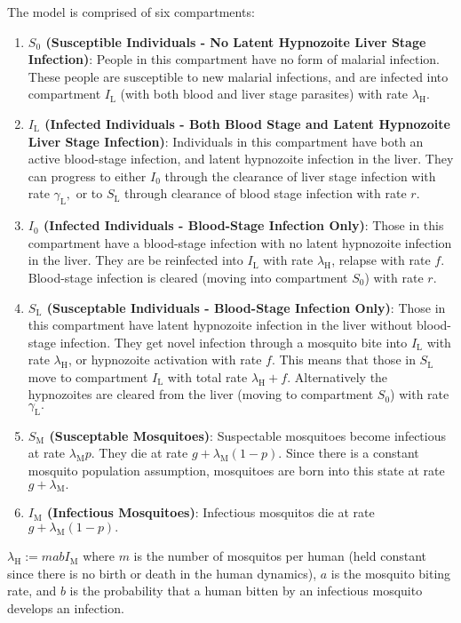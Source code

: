The model is comprised of six compartments: \begin{enumerate}
    \item \textbf{$S_0$ (Susceptible Individuals - No Latent Hypnozoite Liver Stage Infection)}: People in this compartment have no form of malarial infection. These people are susceptible to new malarial infections, and are infected into compartment $I_\mathrm{L}$ (with both blood and liver stage parasites) with rate $\lambda_\mathrm{H}$.
    \item \textbf{$I_\mathrm{L}$ (Infected Individuals - Both Blood Stage and Latent Hypnozoite Liver Stage Infection)}:  Individuals in this compartment have both an active blood-stage infection, and latent hypnozoite infection in the liver. They can progress to either $I_0$ through the clearance of liver stage infection with rate $\gamma_\mathrm{L},$ or to $S_\mathrm{L}$ through clearance of blood stage infection with rate $r$.
    \item \textbf{$I_0$ (Infected Individuals - Blood-Stage Infection Only)}: Those in this compartment have a blood-stage infection with no latent hypnozoite infection in the liver. They are be reinfected into $I_\mathrm{L}$ with rate $\lambda_\mathrm{H}$, relapse with rate $f$. Blood-stage infection is cleared (moving into compartment $S_0$) with rate $r$.
    \item \textbf{$S_\mathrm{L}$ (Susceptable Individuals - Blood-Stage Infection Only)}: Those in this compartment have latent hypnozoite infection in the liver without blood-stage infection. They get novel infection through a mosquito bite into $I_\mathrm{L}$ with rate $\lambda_\mathrm{H}$, or hypnozoite activation with rate $f$. This means that those in $S_\mathrm{L}$ move to compartment $I_\mathrm{L}$ with total rate $\lambda_\mathrm{H} + f.$ Alternatively the hypnozoites are cleared from the liver (moving to compartment $S_0$) with rate $\gamma_\mathrm{L}.$
    \item \textbf{$S_\mathrm{M}$ (Susceptable Mosquitoes)}: Suspectable mosquitoes become infectious at rate $\lambda_\mathrm{M}p.$ They die at rate $g + \lambda_\mathrm{M}(1 - p).$ Since there is a constant mosquito population assumption, mosquitoes are born into this state at rate $g + \lambda_\mathrm{M}.$
    \item \textbf{$I_\mathrm{M}$ (Infectious Mosquitoes)}: Infectious mosquitos die at rate $g + \lambda_\mathrm{M}(1 - p).$
\end{enumerate}

$\lambda_\mathrm{H} := mabI_\mathrm{M}$ where $m$ is the number of mosquitos per human (held constant since there is no birth or death in the human dynamics), $a$ is the mosquito biting rate, and $b$ is the probability that a human bitten by an infectious mosquito develops an infection.

